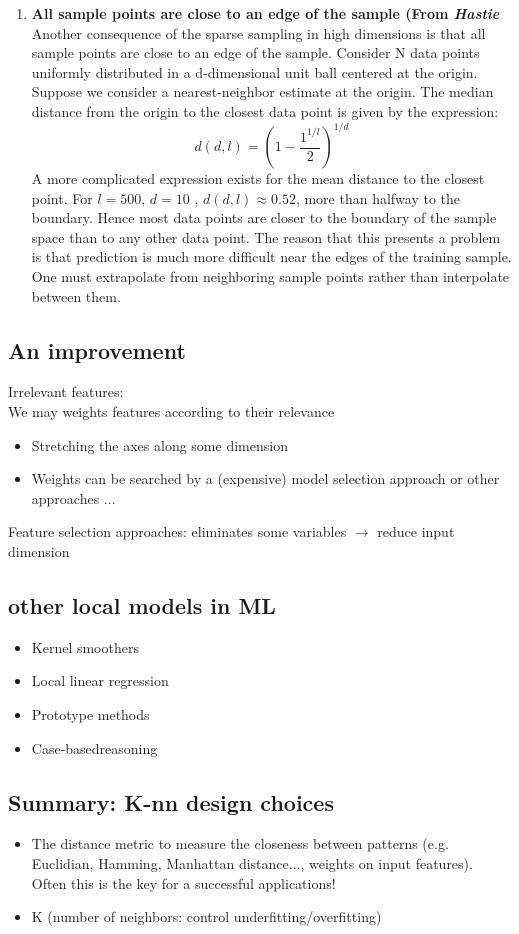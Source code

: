 \documentclass[../main.tex]{subfiles}
\begin{document}
\begin{enumerate}
    
    \item \textbf{All sample points are close to an edge of the sample (From \textit{Hastie}}
    Another consequence of the sparse sampling in high dimensions is that all sample points are close to an edge of the sample. Consider N data points uniformly distributed in a d-dimensional unit ball centered at the origin. Suppose we consider a nearest-neighbor estimate at the origin. The median distance from the origin to the closest data point is given by the expression:
    $$ d(d,l) = \left(1 - \frac{1^{1/l}}{2}\right)^{1/d}$$
    A more complicated expression exists for the mean distance to the closest point. For $l = 500$, $d = 10$ , $d(d,l) \approx	0.52$, more than halfway to the boundary. Hence most data points are closer to the boundary of the sample space than to any other data point. The reason that this presents a problem is that prediction is much more difficult near the edges of the training sample. One must extrapolate from neighboring sample points rather than interpolate between them.
\end{enumerate}

\subsection{An improvement}
Irrelevant features:\\
We may weights features according to their relevance
\begin{itemize}
    \item Stretching the axes along some dimension
    \item Weights can be searched by a (expensive) model selection approach or other approaches ...
\end{itemize}
Feature selection approaches: eliminates some variables $\rightarrow$ reduce input dimension

\subsection{other local models in ML}
\begin{itemize}
    \item Kernel smoothers
    \item Local linear regression
    \item Prototype methods
    \item Case-basedreasoning
\end{itemize}

\subsection{Summary: K-nn design choices}
\begin{itemize}
    \item The distance metric to measure the closeness between patterns (e.g. Euclidian, Hamming, Manhattan distance..., weights on input features). Often this is the key for a successful applications!
    \item K (number of neighbors: control underfitting/overfitting)
\end{itemize}
\end{document}
